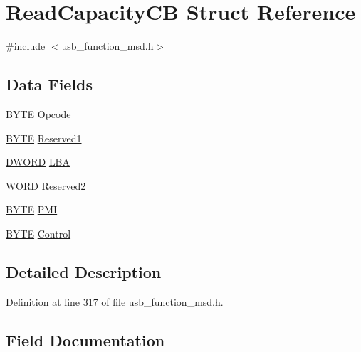 \hypertarget{struct_read_capacity_c_b}{}\section{Read\+Capacity\+C\+B Struct Reference}
\label{struct_read_capacity_c_b}


{\ttfamily \#include $<$usb\+\_\+function\+\_\+msd.\+h$>$}

\subsection*{Data Fields}
\begin{DoxyCompactItemize}
\item 
\hyperlink{_generic_type_defs_8h_a4ae1dab0fb4b072a66584546209e7d58}{B\+Y\+T\+E} \hyperlink{struct_read_capacity_c_b_a3ac7536b907732d60214ae553910eed9}{Opcode}
\item 
\hyperlink{_generic_type_defs_8h_a4ae1dab0fb4b072a66584546209e7d58}{B\+Y\+T\+E} \hyperlink{struct_read_capacity_c_b_a0e359e73bbb61ef44681fba3fd463b5d}{Reserved1}
\item 
\hyperlink{_generic_type_defs_8h_ad342ac907eb044443153a22f964bf0af}{D\+W\+O\+R\+D} \hyperlink{struct_read_capacity_c_b_a025861a8c903e77ef60526f18da19bb1}{L\+B\+A}
\item 
\hyperlink{_generic_type_defs_8h_a2b0e863dadf920709ec53d9088ee7c91}{W\+O\+R\+D} \hyperlink{struct_read_capacity_c_b_a5a2395e6b7ac3b0b4d0278f716d1d3fb}{Reserved2}
\item 
\hyperlink{_generic_type_defs_8h_a4ae1dab0fb4b072a66584546209e7d58}{B\+Y\+T\+E} \hyperlink{struct_read_capacity_c_b_ae3e24593a6a3b388840b8984a96583c8}{P\+M\+I}
\item 
\hyperlink{_generic_type_defs_8h_a4ae1dab0fb4b072a66584546209e7d58}{B\+Y\+T\+E} \hyperlink{struct_read_capacity_c_b_a5dc24656c27deb12af74c98930f0bfc5}{Control}
\end{DoxyCompactItemize}


\subsection{Detailed Description}


Definition at line 317 of file usb\+\_\+function\+\_\+msd.\+h.



\subsection{Field Documentation}
\hypertarget{struct_read_capacity_c_b_a5dc24656c27deb12af74c98930f0bfc5}{}
